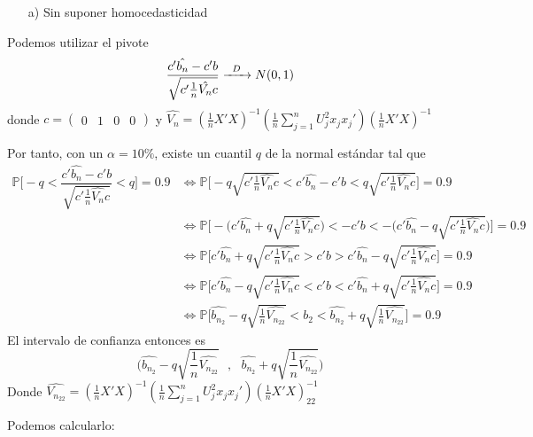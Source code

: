 \documentclass[
]{article}
\begin{document}
\begin{itemize}
  \item[a)] Sin suponer homocedasticidad
\end{itemize}

Podemos utilizar el pivote \[
\dfrac{c'\hat{b_n} - c'b}{\sqrt{c'\frac{1}{n}\hat{V_n}c}} \xrightarrow{\enskip D\enskip} N(0,1)
\] donde \(c=\begin{pmatrix} 0 & 1 & 0 & 0 \end{pmatrix}\) y
\(\hat{V_n} = (\frac{1}{n}X'X)^{-1} (\frac{1}{n}\sum_{j=1}^{n} U_j^2x_jx_j') (\frac{1}{n}X'X)^{-1}\)

Por tanto, con un \(\alpha=10\%\), existe un cuantil \(q\) de la normal
estándar tal que \[
\begin{aligned}
  \mathbb{P}\Bigg[ -q < \dfrac{c'\hat{b_n} - c'b}{\sqrt{c'\frac{1}{n}\hat{V_n}c}} < q \Bigg] = 0.9
  &\iff
  \mathbb{P}\Bigg[ -q\sqrt{c'\frac{1}{n}\hat{V_n}c} < c'\hat{b_n} - c'b< q\sqrt{c'\frac{1}{n}\hat{V_n}c} \Bigg] = 0.9 \\
  &\iff
  \mathbb{P}\Bigg[ - \Big(c'\hat{b_n} + q\sqrt{c'\frac{1}{n}\hat{V_n}c}\Big) <  - c'b < - \Big(c'\hat{b_n} - q\sqrt{c'\frac{1}{n}\hat{V_n}c}\Big) \Bigg] = 0.9 \\
  &\iff
  \mathbb{P}\Bigg[ c'\hat{b_n} + q\sqrt{c'\frac{1}{n}\hat{V_n}c} > c'b > c'\hat{b_n} - q\sqrt{c'\frac{1}{n}\hat{V_n}c} \Bigg] = 0.9 \\
  &\iff
  \mathbb{P}\Bigg[ c'\hat{b_n} - q\sqrt{c'\frac{1}{n}\hat{V_n}c} < c'b < c'\hat{b_n} + q\sqrt{c'\frac{1}{n}\hat{V_n}c} \Bigg] = 0.9 \\
  &\iff
  \mathbb{P}\Bigg[ \hat{b_{n_2}} - q\sqrt{\frac{1}{n}\hat{V_{n_{22}}}} < b_2 < \hat{b_{n_2}} + q\sqrt{\frac{1}{n}\hat{V_{n_{22}}}} \Bigg] = 0.9
\end{aligned}
\] El intervalo de confianza entonces es \[
\Bigg(\hat{b_{n_2}} - q\sqrt{\frac{1}{n}\hat{V_{n_{22}}}} \ \ \ , \ \ \ \hat{b_{n_2}} + q\sqrt{\frac{1}{n}\hat{V_{n_{22}}}}\Bigg)
\] Donde
\(\hat{V_{n_{22}}} = (\frac{1}{n}X'X)^{-1} (\frac{1}{n}\sum_{j=1}^{n} U_j^2x_jx_j') (\frac{1}{n}X'X)^{-1}_{22}\)

Podemos calcularlo:
\end{document}
